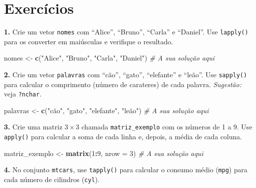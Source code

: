 \documentclass[
  portuguese,
  11pt,
  openany]{book}
\newenvironment{Shaded}{\begin{snugshade}}{\end{snugshade}}
\newcommand{\AttributeTok}[1]{\textcolor[rgb]{0.13,0.29,0.53}{#1}}
\newcommand{\CommentTok}[1]{\textcolor[rgb]{0.56,0.35,0.01}{\textit{#1}}}
\newcommand{\DecValTok}[1]{\textcolor[rgb]{0.00,0.00,0.81}{#1}}
\newcommand{\FunctionTok}[1]{\textcolor[rgb]{0.13,0.29,0.53}{\textbf{#1}}}
\newcommand{\NormalTok}[1]{#1}
\newcommand{\OtherTok}[1]{\textcolor[rgb]{0.56,0.35,0.01}{#1}}
\newcommand{\SpecialCharTok}[1]{\textcolor[rgb]{0.81,0.36,0.00}{\textbf{#1}}}
\newcommand{\StringTok}[1]{\textcolor[rgb]{0.31,0.60,0.02}{#1}}
\begin{document}
\section{Exercícios}\label{exercuxedcios-13}

\textbf{1.} Crie um vetor \texttt{nomes} com ``Alice'', ``Bruno'', ``Carla'' e ``Daniel''. Use \texttt{lapply()}
para os converter em maiúsculas e verifique o resultado.

\begin{Shaded}
\begin{Highlighting}[]
\NormalTok{nomes }\OtherTok{\textless{}{-}} \FunctionTok{c}\NormalTok{(}\StringTok{"Alice"}\NormalTok{, }\StringTok{"Bruno"}\NormalTok{, }\StringTok{"Carla"}\NormalTok{, }\StringTok{"Daniel"}\NormalTok{)}
\CommentTok{\# A sua solução aqui}
\end{Highlighting}
\end{Shaded}

\textbf{2.} Crie um vetor \texttt{palavras} com ``cão'', ``gato'', ``elefante'' e ``leão''. Use \texttt{sapply()}
para calcular o comprimento (número de carateres) de cada palavra. \emph{Sugestão:} veja
\texttt{?nchar}.

\begin{Shaded}
\begin{Highlighting}[]
\NormalTok{palavras }\OtherTok{\textless{}{-}} \FunctionTok{c}\NormalTok{(}\StringTok{"cão"}\NormalTok{, }\StringTok{"gato"}\NormalTok{, }\StringTok{"elefante"}\NormalTok{, }\StringTok{"leão"}\NormalTok{)}
\CommentTok{\# A sua solução aqui}
\end{Highlighting}
\end{Shaded}

\textbf{3.} Crie uma matriz \(3 \times 3\) chamada \texttt{matriz\_exemplo} com os números de 1 a 9.
Use \texttt{apply()} para calcular a soma de cada linha e, depois, a média de cada coluna.

\begin{Shaded}
\begin{Highlighting}[]
\NormalTok{matriz\_exemplo }\OtherTok{\textless{}{-}} \FunctionTok{matrix}\NormalTok{(}\DecValTok{1}\SpecialCharTok{:}\DecValTok{9}\NormalTok{, }\AttributeTok{nrow =} \DecValTok{3}\NormalTok{)}
\CommentTok{\# A sua solução aqui}
\end{Highlighting}
\end{Shaded}

\textbf{4.} No conjunto \texttt{mtcars}, use \texttt{tapply()} para calcular o consumo médio (\texttt{mpg}) para
cada número de cilindros (\texttt{cyl}).
\end{document}
